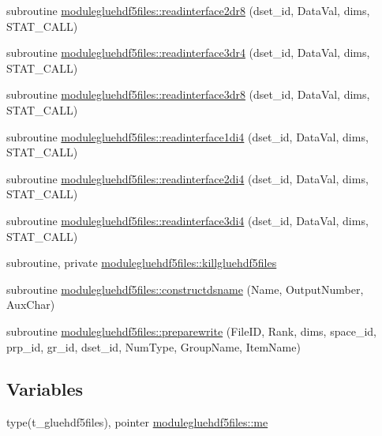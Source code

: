 \begin{DoxyCompactItemize}
\item 
subroutine \mbox{\hyperlink{namespacemodulegluehdf5files_a4c82afb4d739b4b7b9ef8b8143ce5cb0}{modulegluehdf5files\+::readinterface2dr8}} (dset\+\_\+id, Data\+Val, dims, S\+T\+A\+T\+\_\+\+C\+A\+LL)
\item 
subroutine \mbox{\hyperlink{namespacemodulegluehdf5files_a645aa70b5f322da2680c2517ec2c3cd2}{modulegluehdf5files\+::readinterface3dr4}} (dset\+\_\+id, Data\+Val, dims, S\+T\+A\+T\+\_\+\+C\+A\+LL)
\item 
subroutine \mbox{\hyperlink{namespacemodulegluehdf5files_a9d59684aa45b65c72b30b9ad0578c349}{modulegluehdf5files\+::readinterface3dr8}} (dset\+\_\+id, Data\+Val, dims, S\+T\+A\+T\+\_\+\+C\+A\+LL)
\item 
subroutine \mbox{\hyperlink{namespacemodulegluehdf5files_a0d8abf73fe0fd746139f9d1d9563e66e}{modulegluehdf5files\+::readinterface1di4}} (dset\+\_\+id, Data\+Val, dims, S\+T\+A\+T\+\_\+\+C\+A\+LL)
\item 
subroutine \mbox{\hyperlink{namespacemodulegluehdf5files_a6cd5bbeb2550967007726da38e10364f}{modulegluehdf5files\+::readinterface2di4}} (dset\+\_\+id, Data\+Val, dims, S\+T\+A\+T\+\_\+\+C\+A\+LL)
\item 
subroutine \mbox{\hyperlink{namespacemodulegluehdf5files_a299ce12989f72b96cfb4d801675689ac}{modulegluehdf5files\+::readinterface3di4}} (dset\+\_\+id, Data\+Val, dims, S\+T\+A\+T\+\_\+\+C\+A\+LL)
\item 
subroutine, private \mbox{\hyperlink{namespacemodulegluehdf5files_a07002430e2da49aa4ce7da8244ca8dbd}{modulegluehdf5files\+::killgluehdf5files}}
\item 
subroutine \mbox{\hyperlink{namespacemodulegluehdf5files_a50f42179c2c16aa6c290cd9672da239b}{modulegluehdf5files\+::constructdsname}} (Name, Output\+Number, Aux\+Char)
\item 
subroutine \mbox{\hyperlink{namespacemodulegluehdf5files_a2b70cc6d35be5763a50ac4153fb03cc5}{modulegluehdf5files\+::preparewrite}} (File\+ID, Rank, dims, space\+\_\+id, prp\+\_\+id, gr\+\_\+id, dset\+\_\+id, Num\+Type, Group\+Name, Item\+Name)
\end{DoxyCompactItemize}
\subsection*{Variables}
\begin{DoxyCompactItemize}
\item 
type(t\+\_\+gluehdf5files), pointer \mbox{\hyperlink{namespacemodulegluehdf5files_a6bfec83bc34daf2b7b6eb91ee72f586f}{modulegluehdf5files\+::me}}
\end{DoxyCompactItemize}
